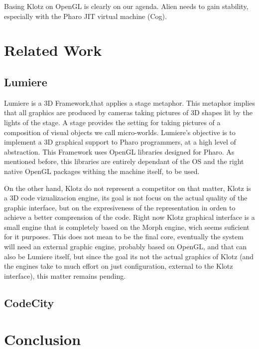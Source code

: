 \documentclass{sig-alternate}
\newcommand{\seclabel}[1]{\label{sec:#1}}
\begin{document}
Basing Klotz on OpenGL is clearly on our agenda. Alien needs to gain stability, especially with the Pharo JIT virtual machine (Cog).

\section{Related Work} \seclabel{relatedwork}

\subsection{Lumiere~\cite{Oliv09a}}
Lumiere is a 3D Framework,that applies a stage metaphor.
This metaphor implies that all graphics are produced by cameras
taking pictures of 3D shapes lit by the lights of the stage. A
stage provides the setting for taking pictures of a composition 
of visual objects we call micro-worlds. Lumiere's objective
is to implement a 3D graphical support to Pharo programmers, at
a high level of abstraction. This Framework uses OpenGL libraries
designed for Pharo. As mentioned before, this libraries are 
entirely dependant of the OS and the right native OpenGL packages
withing the machine itself, to be used.

On the other hand, Klotz do not represent a competitor on that 
matter, Klotz is a 3D code vizualizacion engine, its goal is
not focus on the actual quality of the graphic interface, but 
on the expresiveness of the representation in orden to achieve
a better comprension of the code. Right now Klotz graphical
interface is a small engine that is completely based on the Morph
engine, wich seems suficient for it  purposes. This does not
mean to be the final core, eventually the system will need an
external graphic engine, probably based on OpenGL, and that can
also be Lumiere itself, but since the goal its not the actual
graphics of Klotz (and the engines take to much effort on just
configuration, external to the Klotz interface), this matter
remains pending.

\subsection{CodeCity~\cite{Wett08d}}


\section{Conclusion} \seclabel{conclusion}
\end{document}
